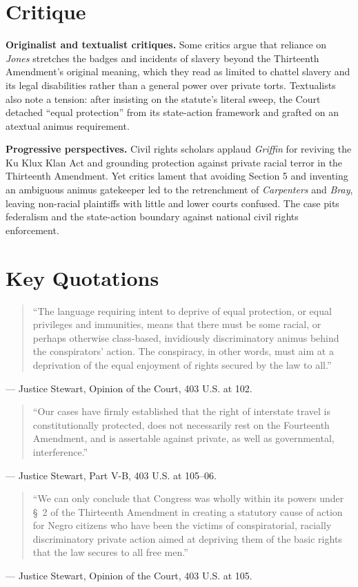 \documentclass[12pt]{article}
\begin{document}
\section{Critique}

\textbf{Originalist and textualist critiques.} Some critics argue that reliance on \textit{Jones} stretches the badges and incidents of slavery beyond the Thirteenth Amendment's original meaning, which they read as limited to chattel slavery and its legal disabilities rather than a general power over private torts. Textualists also note a tension: after insisting on the statute's literal sweep, the Court detached ``equal protection'' from its state-action framework and grafted on an atextual animus requirement.

\textbf{Progressive perspectives.} Civil rights scholars applaud \textit{Griffin} for reviving the Ku Klux Klan Act and grounding protection against private racial terror in the Thirteenth Amendment. Yet critics lament that avoiding Section 5 and inventing an ambiguous animus gatekeeper led to the retrenchment of \textit{Carpenters} and \textit{Bray}, leaving non-racial plaintiffs with little and lower courts confused. The case pits federalism and the state-action boundary against national civil rights enforcement.

\section{Key Quotations}

\begin{quote}
``The language requiring intent to deprive of equal protection, or equal privileges and immunities, means that there must be some racial, or perhaps otherwise class-based, invidiously discriminatory animus behind the conspirators' action. The conspiracy, in other words, must aim at a deprivation of the equal enjoyment of rights secured by the law to all.''
\end{quote}
\noindent --- Justice Stewart, Opinion of the Court, 403 U.S. at 102.

\begin{quote}
``Our cases have firmly established that the right of interstate travel is constitutionally protected, does not necessarily rest on the Fourteenth Amendment, and is assertable against private, as well as governmental, interference.''
\end{quote}
\noindent --- Justice Stewart, Part V-B, 403 U.S. at 105--06.

\begin{quote}
``We can only conclude that Congress was wholly within its powers under \S~2 of the Thirteenth Amendment in creating a statutory cause of action for Negro citizens who have been the victims of conspiratorial, racially discriminatory private action aimed at depriving them of the basic rights that the law secures to all free men.''
\end{quote}
\noindent --- Justice Stewart, Opinion of the Court, 403 U.S. at 105.
\end{document}
